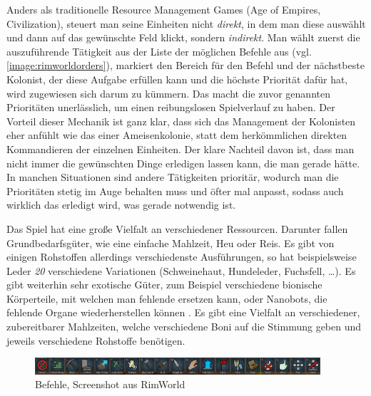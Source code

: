 Anders als traditionelle Resource Management Games (Age of Empires, Civilization), steuert man seine Einheiten nicht \textit{direkt}, in dem man diese auswählt und dann auf das gewünschte Feld klickt, sondern \textit{indirekt}. Man wählt zuerst die auszuführende Tätigkeit aus der Liste der möglichen Befehle aus (vgl. \autoref{image:rimworldorders}), markiert den Bereich für den Befehl und der nächstbeste Kolonist, der diese Aufgabe erfüllen kann und die höchste Priorität dafür hat, wird zugewiesen sich darum zu kümmern. Das macht die zuvor genannten Prioritäten unerlässlich, um einen reibungslosen Spielverlauf zu haben. Der Vorteil dieser Mechanik ist ganz klar, dass sich das Management der Kolonisten eher anfühlt wie das einer Ameisenkolonie, statt dem herkömmlichen direkten Kommandieren der einzelnen Einheiten. Der klare Nachteil davon ist, dass man nicht immer die gewünschten Dinge erledigen lassen kann, die man gerade hätte. In manchen Situationen sind andere Tätigkeiten prioritär, wodurch man die Prioritäten stetig im Auge behalten muss und öfter mal anpasst, sodass auch wirklich das erledigt wird, was gerade notwendig ist.

Das Spiel hat eine große Vielfalt an verschiedener Ressourcen. Darunter fallen Grundbedarfsgüter, wie eine einfache Mahlzeit, Heu oder Reis. Es gibt von einigen Rohstoffen allerdings verschiedenste Ausführungen, so hat beispielsweise Leder \textit{20} verschiedene Variationen (Schweinehaut, Hundeleder, Fuchsfell, \dots). Es gibt weiterhin sehr exotische Güter, zum Beispiel verschiedene bionische Körperteile, mit welchen man fehlende ersetzen kann, oder Nanobots, die fehlende Organe wiederherstellen können \cite*[]{rimworld:resources}. Es gibt eine Vielfalt an verschiedener, zubereitbarer Mahlzeiten, welche verschiedene Boni auf die Stimmung geben und jeweils verschiedene Rohstoffe benötigen.


\begin{figure}
    \begin{center}
        \includegraphics[width=400px]{0.bilder/rimworldorders.png}
    \end{center}
    \caption{Befehle, Screenshot aus RimWorld} \label{image:rimworldorders}
\end{figure}